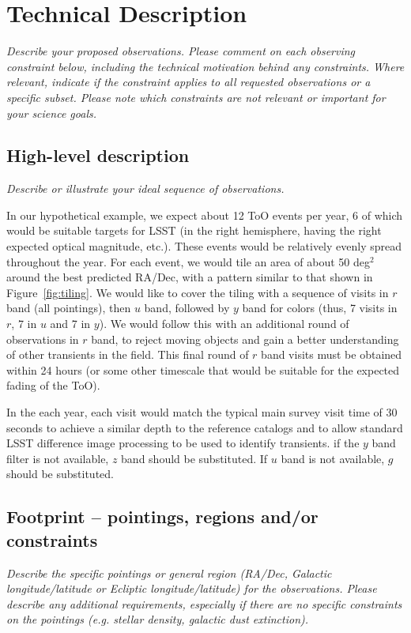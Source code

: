 \documentclass[12pt, letterpaper]{article}
\begin{document}
\clearpage

\section{Technical Description}
\begin{footnotesize}
{\it Describe your proposed observations. Please comment on each observing constraint
below, including the technical motivation behind any constraints. Where relevant, indicate
if the constraint applies to all requested observations or a specific subset. Please note which 
constraints are not relevant or important for your science goals.}
\end{footnotesize}

\subsection{High-level description}
\begin{footnotesize}
{\it Describe or illustrate your ideal sequence of observations.}
\end{footnotesize}

In our hypothetical example, we expect about 12 ToO events per year, 6 of which would be suitable targets for LSST (in the right hemisphere, 
having the right expected optical magnitude, etc.). These events would be relatively evenly spread throughout 
the year. For each event, we would tile an area of about 50 deg$^2$ around
the best predicted RA/Dec, with a pattern similar to that shown in Figure~\ref{fig:tiling}. We would like to cover
the tiling with a sequence of visits in $r$ band (all pointings), then $u$ band, followed by $y$ band for colors (thus, 7 visits in
$r$, 7 in $u$ and 7 in $y$).  We would follow this with an additional round of observations in $r$ band, to reject moving objects
and gain a better understanding of other transients in the field. This final round of $r$ band visits must be obtained within 24 hours
(or some other timescale that would be suitable for the expected fading of the ToO).  

In the each year, each visit would match the typical main survey visit time of 30 seconds to achieve a similar depth to the reference catalogs
and to allow standard LSST difference image processing to be used to identify transients. 
if the $y$ band filter is not available, $z$ band should be substituted. If $u$ band is not available, $g$ should be substituted.

\subsection{Footprint -- pointings, regions and/or constraints}
\begin{footnotesize}{\it Describe the specific pointings or general region (RA/Dec, Galactic longitude/latitude or 
Ecliptic longitude/latitude) for the observations. Please describe any additional requirements, especially if there
are no specific constraints on the pointings (e.g. stellar density, galactic dust extinction).}
\end{footnotesize}
\end{document}
